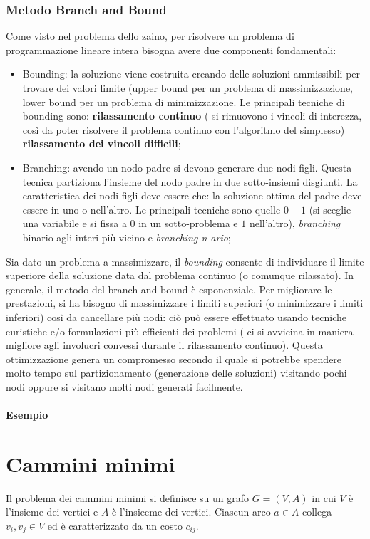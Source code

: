 \documentclass{article}
\begin{document}
\subsubsection{Metodo Branch and Bound}
Come visto nel problema dello zaino, per risolvere un problema di programmazione 
lineare intera bisogna avere due componenti fondamentali:
\begin{itemize}
  \item Bounding: la soluzione viene costruita creando delle soluzioni 
    ammissibili per trovare dei valori limite (upper bound per un 
    problema di massimizzazione, lower bound per un problema di minimizzazione.
    Le principali tecniche di bounding sono: \textbf{rilassamento continuo} (
    si rimuovono i vincoli di interezza, così da poter risolvere il problema
    continuo con l'algoritmo del simplesso) \textbf{rilassamento dei vincoli
    difficili};
  \item Branching: avendo un nodo padre si devono generare due nodi figli.
    Questa tecnica partiziona l'insieme del nodo padre in due sotto-insiemi
    disgiunti. La caratteristica dei nodi figli deve essere che: la soluzione 
    ottima del padre deve essere in uno o nell'altro. Le principali tecniche 
    sono quelle $0-1$ (si sceglie una variabile e si fissa a $0$ in un 
    sotto-problema e $1$ nell'altro), \textit{branching} binario agli interi 
    più vicino e \textit{branching n-ario};
\end{itemize}

Sia dato un problema a massimizzare, il \textit{bounding} consente di 
individuare il limite superiore della soluzione data dal problema continuo (o 
comunque rilassato).
In generale, il metodo del branch and bound è esponenziale. Per migliorare le 
prestazioni, si ha bisogno di massimizzare i limiti superiori (o minimizzare 
i limiti inferiori) così da cancellare più nodi: ciò può essere effettuato 
usando tecniche euristiche e/o formulazioni più efficienti dei problemi (
ci si avvicina in maniera migliore agli involucri convessi durante il 
rilassamento continuo). Questa ottimizzazione genera un compromesso secondo il 
quale si potrebbe spendere molto tempo sul partizionamento (generazione 
delle soluzioni) visitando pochi nodi oppure si visitano molti nodi generati 
facilmente.

\paragraph{Esempio}

\section{Cammini minimi}
Il problema dei cammini minimi si definisce su un grafo $G=(V,A)$ in cui $V$ è 
l'insieme dei vertici e $A$ è l'insieeme dei vertici. Ciascun arco $a \in A$
collega $v_i,v_j \in V$ ed è caratterizzato da un costo $c_{ij}$. 
\end{document}
